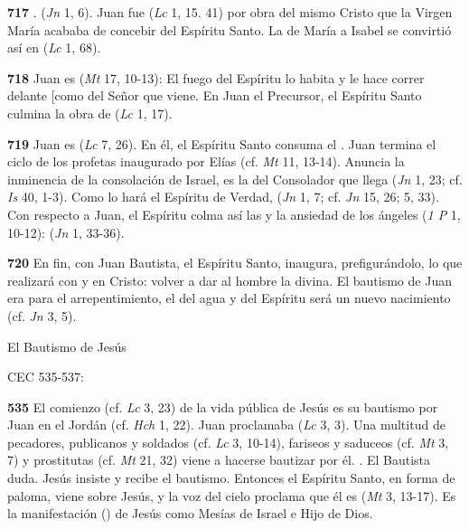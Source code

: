 {\textbf{717} . (\emph{Jn} 1, 6). Juan fue  (\emph{Lc} 1, 15. 41) por obra del mismo Cristo que la Virgen María acababa de concebir del Espíritu Santo. La  de María a Isabel se convirtió así en  (\emph{Lc} 1, 68).

\textbf{718} Juan es  (\emph{Mt} 17, 10-13): El fuego del Espíritu lo habita y le hace correr delante {[}como \textquote{precursor}{]} del Señor que viene. En Juan el Precursor, el Espíritu Santo culmina la obra de  (\emph{Lc} 1, 17).

\textbf{719} Juan es  (\emph{Lc} 7, 26). En él, el Espíritu Santo consuma el . Juan termina el ciclo de los profetas inaugurado por Elías (cf. \emph{Mt} 11, 13-14). Anuncia la inminencia de la consolación de Israel, es la  del Consolador que llega (\emph{Jn} 1, 23; cf. \emph{Is} 40, 1-3). Como lo hará el Espíritu de Verdad,  (\emph{Jn} 1, 7; cf. \emph{Jn} 15, 26; 5, 33). Con respecto a Juan, el Espíritu colma así las  y la ansiedad de los ángeles (\emph{1 P} 1, 10-12):  (\emph{Jn} 1, 33-36).

\textbf{720} En fin, con Juan Bautista, el Espíritu Santo, inaugura, prefigurándolo, lo que realizará con y en Cristo: volver a dar al hombre la  divina. El bautismo de Juan era para el arrepentimiento, el del agua y del Espíritu será un nuevo nacimiento (cf. \emph{Jn} 3, 5).

El Bautismo de Jesús

CEC 535-537:

\textbf{535} El comienzo (cf. \emph{Lc} 3, 23) de la vida pública de Jesús es su bautismo por Juan en el Jordán (cf. \emph{Hch} 1, 22). Juan proclamaba  (\emph{Lc} 3, 3). Una multitud de pecadores, publicanos y soldados (cf. \emph{Lc} 3, 10-14), fariseos y saduceos (cf. \emph{Mt} 3, 7) y prostitutas (cf. \emph{Mt} 21, 32) viene a hacerse bautizar por él. . El Bautista duda. Jesús insiste y recibe el bautismo. Entonces el Espíritu Santo, en forma de paloma, viene sobre Jesús, y la voz del cielo proclama que él es  (\emph{Mt} 3, 13-17). Es la manifestación () de Jesús como Mesías de Israel e Hijo de Dios.

}
